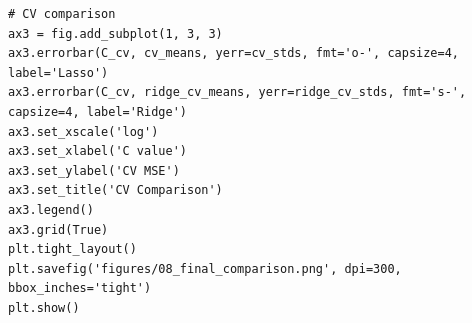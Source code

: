 \documentclass[11pt,a4paper]{article}
\begin{document}
\begin{lstlisting}
# CV comparison
ax3 = fig.add_subplot(1, 3, 3)
ax3.errorbar(C_cv, cv_means, yerr=cv_stds, fmt='o-', capsize=4, label='Lasso')
ax3.errorbar(C_cv, ridge_cv_means, yerr=ridge_cv_stds, fmt='s-', capsize=4, label='Ridge')
ax3.set_xscale('log')
ax3.set_xlabel('C value')
ax3.set_ylabel('CV MSE')
ax3.set_title('CV Comparison')
ax3.legend()
ax3.grid(True)
plt.tight_layout()
plt.savefig('figures/08_final_comparison.png', dpi=300, bbox_inches='tight')
plt.show()
\end{lstlisting} 
\end{document}
